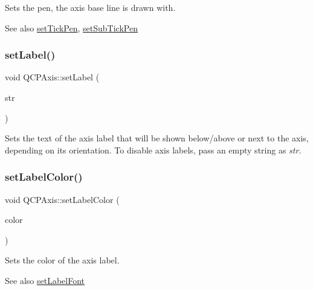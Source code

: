 Sets the pen, the axis base line is drawn with.

\begin{DoxySeeAlso}{See also}
\hyperlink{class_q_c_p_axis_ad80923bcc1c5da4c4db602c5325e797e}{set\+Tick\+Pen}, \hyperlink{class_q_c_p_axis_aede4028ae7516bd51a60618a8233f9cf}{set\+Sub\+Tick\+Pen} 
\end{DoxySeeAlso}
\mbox{\label{class_q_c_p_axis_a33bcc382c111c9f31bb0687352a2dea4}} 
\subsubsection{\texorpdfstring{set\+Label()}{setLabel()}}
{\footnotesize\ttfamily void Q\+C\+P\+Axis\+::set\+Label (\begin{DoxyParamCaption}\item[{const Q\+String \&}]{str }\end{DoxyParamCaption})}

Sets the text of the axis label that will be shown below/above or next to the axis, depending on its orientation. To disable axis labels, pass an empty string as {\itshape str}. \mbox{\label{class_q_c_p_axis_a6c906fe56d75f0122335b9f79b999608}} 
\subsubsection{\texorpdfstring{set\+Label\+Color()}{setLabelColor()}}
{\footnotesize\ttfamily void Q\+C\+P\+Axis\+::set\+Label\+Color (\begin{DoxyParamCaption}\item[{const Q\+Color \&}]{color }\end{DoxyParamCaption})}

Sets the color of the axis label.

\begin{DoxySeeAlso}{See also}
\hyperlink{class_q_c_p_axis_a71ac1a47f7547e490a8c4311d1433cf3}{set\+Label\+Font} 
\end{DoxySeeAlso}
\mbox{\label{class_q_c_p_axis_a71ac1a47f7547e490a8c4311d1433cf3}} 
